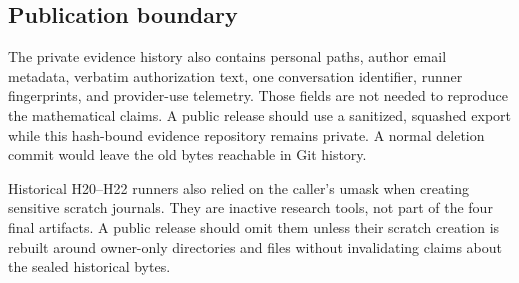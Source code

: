 \documentclass[10pt]{article}
\begin{document}
\subsection*{Publication boundary}

The private evidence history also contains personal paths, author email metadata, verbatim authorization text, one conversation identifier, runner fingerprints, and provider-use telemetry. Those fields are not needed to reproduce the mathematical claims. A public release should use a sanitized, squashed export while this hash-bound evidence repository remains private. A normal deletion commit would leave the old bytes reachable in Git history.

Historical H20--H22 runners also relied on the caller's umask when creating sensitive scratch journals. They are inactive research tools, not part of the four final artifacts. A public release should omit them unless their scratch creation is rebuilt around owner-only directories and files without invalidating claims about the sealed historical bytes.
\end{document}
